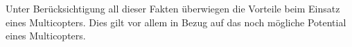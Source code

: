 Unter Berücksichtigung all dieser Fakten überwiegen die Vorteile beim Einsatz eines Multicopters. Dies gilt vor allem in Bezug auf das noch mögliche Potential eines Multicopters.



